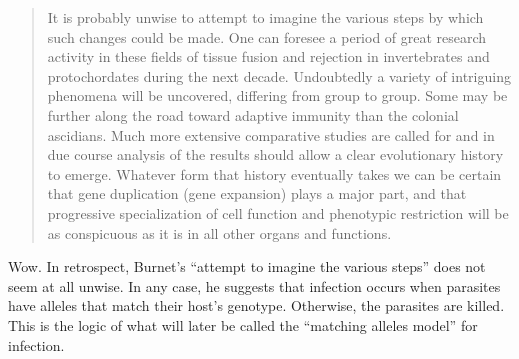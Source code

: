 \documentclass[
  letterpaper,
]{book}
\begin{document}
\begin{quote}
It is probably unwise to attempt to imagine the various steps by which
such changes could be made. One can foresee a period of great research
activity in these fields of tissue fusion and rejection in invertebrates
and protochordates during the next decade. Undoubtedly a variety of
intriguing phenomena will be uncovered, differing from group to group.
Some may be further along the road toward adaptive immunity than the
colonial ascidians. Much more extensive comparative studies are called
for and in due course analysis of the results should allow a clear
evolutionary history to emerge. Whatever form that history eventually
takes we can be certain that gene duplication (gene expansion) plays a
major part, and that progressive specialization of cell function and
phenotypic restriction will be as conspicuous as it is in all other
organs and functions.
\end{quote}

Wow. In retrospect, Burnet's ``attempt to imagine the various steps''
does not seem at all unwise. In any case, he suggests that infection
occurs when parasites have alleles that match their host's genotype.
Otherwise, the parasites are killed. This is the logic of what will
later be called the ``matching alleles model'' for infection.
\end{document}
